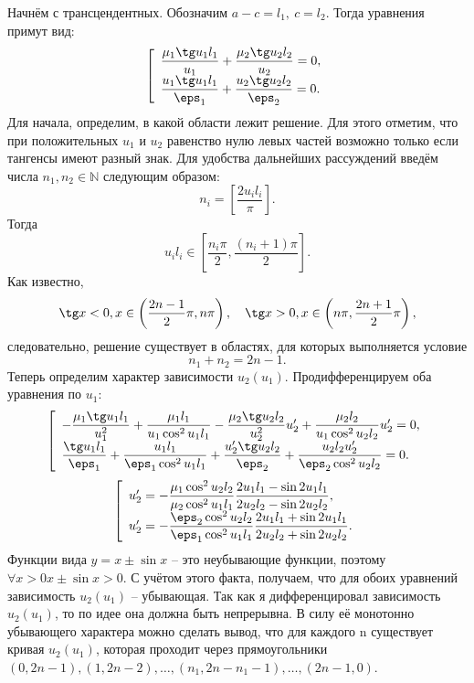 \documentclass[12pt]{hedsemwork}
\renewcommand{\frac}{\dfrac}
\begin{document}
\begin{appendix}
Начнём с трансцендентных. Обозначим \( a - c = l_1,\ c = l_2 \). Тогда уравнения
примут вид:
\[
    \left[
        \begin{array}{l}
            \frac{\mu_1\tg u_1 l_1}{u_1} + \frac{\mu_2\tg u_2 l_2}{u_2} = 0,\\
            \frac{u_1\tg u_1 l_1}{\eps_1} + \frac{u_2\tg u_2 l_2}{\eps_2} = 0.
        \end{array}
    \right.
\]
Для начала, определим, в какой области лежит решение. Для этого отметим, что
при положительных \( u_1 \) и \( u_2 \) равенство нулю левых частей возможно
только если тангенсы имеют разный знак. Для удобства дальнейших рассуждений
введём числа \( n_1, n_2 \in \mathbb{N} \) следующим образом:
\[
    n_i = \left[ \frac{2 u_i l_i}{\pi} \right].
\]
Тогда
\[
    u_i l_i \in \left[ \frac{n_i\pi}{2}, \frac{(n_i + 1)\pi}{2}\right].
\]
Как известно,
\[
    \tg x < 0, x \in \left(\frac{2n-1}{2}\pi, n\pi\right),\quad
    \tg x > 0, x \in \left(n\pi, \frac{2n+1}{2}\pi\right),
\]
следовательно, решение существует в областях, для которых выполняется условие
\[
    n_1 + n_2 = 2n -1.
\]
Теперь определим характер зависимости \( u_2(u_1) \). Продифференцируем оба
уравнения по \( u_1 \):
\[
    \left[
        \begin{array}{l}
            -\frac{\mu_1\tg u_1 l_1}{u_1^2} +
            \frac{\mu_1l_1}{u_1\cos^2u_1l_1}
            - \frac{\mu_2\tg u_2 l_2}{u_2^2}u_2' +
            \frac{\mu_2l_2}{u_1\cos^2u_2 l_2}u_2' = 0,\\
            \frac{\tg u_1 l_1}{\eps_1} + \frac{u_1l_1}{\eps_1\cos^2u_1l_1}
            + \frac{u_2'\tg u_2 l_2}{\eps_2} +
            \frac{u_2l_2u_2'}{\eps_2\cos^2u_2l_2} = 0.
        \end{array}
    \right.
\]
\[
    \left[
        \begin{array}{l}
            u_2' = -\frac{\mu_1\cos^2u_2l_2}{\mu_2\cos^2u_1l_1}
            \frac{2u_1l_1 - \sin 2 u_1l_1}{2u_2 l_2 - \sin 2 u_2 l_2},\\
            u_2' = -\frac{\eps_2\cos^2u_2l_2}{\eps_1\cos^2u_1l_1}
            \frac{2u_1l_1 + \sin 2 u_1l_1}{2u_2 l_2 + \sin 2 u_2 l_2}.\\
        \end{array}
    \right.
\]
Функции вида \( y = x \pm \sin x \) -- это неубывающие функции, поэтому
\( \forall x > 0 x\pm\sin x > 0 \). С учётом этого факта, получаем, что для обоих
уравнений зависимость \( u_2(u_1) \) -- убывающая.
Так как я дифференцировал зависимость \( u_2(u_1) \), то по идее она должна быть
непрерывна. В силу её монотонно убывающего характера можно сделать вывод, что
для каждого n существует кривая \( u_2(u_1) \), которая проходит через
прямоугольники
\( (0, 2n-1), (1, 2n-2), \ldots, (n_1, 2n - n_1 - 1 ), \ldots, (2n-1, 0) \).


\end{appendix}
\end{document}

